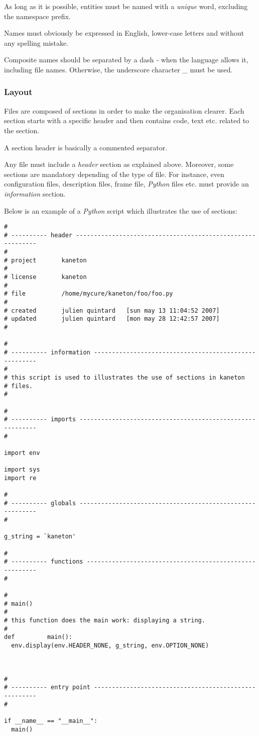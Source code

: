 As long as it is possible, entities must be named with a \textit{unique}
word, excluding the namespace prefix.

Names must obviously be expressed in English, lower-case letters and
without any spelling mistake.

Composite names should be separated by a dash \textit{-} when the language
allows it, including file names. Otherwise, the underscore character
\textit{\_} must be used.


\subsubsection{Layout}

Files are composed of sections in order to make the organisation clearer.
Each section starts with a specific header and then contains code, text etc.
related to the section.

A section header is basically a commented separator.

Any file must include a \textit{header} section as explained above. Moreover,
some sections are mandatory depending of the type of file. For instance,
even configuration files, description files, frame file, \textit{Python}
files etc. must provide an \textit{information} section.

Below is an example of a \textit{Python} script which illustrates the
use of sections:

\begin{verbatim}
#
# ---------- header -----------------------------------------------------------
#
# project       kaneton
#
# license       kaneton
#
# file          /home/mycure/kaneton/foo/foo.py
#
# created       julien quintard   [sun may 13 11:04:52 2007]
# updated       julien quintard   [mon may 28 12:42:57 2007]
#

#
# ---------- information ------------------------------------------------------
#
# this script is used to illustrates the use of sections in kaneton
# files.
#

#
# ---------- imports ----------------------------------------------------------
#

import env

import sys
import re

#
# ---------- globals ----------------------------------------------------------
#

g_string = `kaneton'

#
# ---------- functions --------------------------------------------------------
#

#
# main()
#
# this function does the main work: displaying a string.
#
def			main():
  env.display(env.HEADER_NONE, g_string, env.OPTION_NONE)



#
# ---------- entry point ------------------------------------------------------
#

if __name__ == "__main__":
  main()

\end{verbatim}


